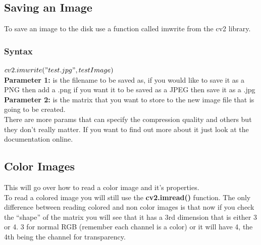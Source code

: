 \documentclass[fleqn]{article}
\begin{document}
    \subsection{Saving an Image}
    To save an image to the disk use a function called imwrite from the cv2 library.
    \subsubsection{Syntax}
    \begin{center}
      $cv2.imwrite("test.jpg", testImage)$\\
      \textbf{Parameter 1:} is the filename to be saved as, if you would like to save it as a PNG then add a .png if you want it to be saved as a JPEG then save it as a .jpg\\
      \textbf{Parameter 2:} is the matrix that you want to store to the new image file that is going to be created. \\
      There are more params that can specify the compression quality and others but they don't really matter. If you want to find out more about it just look at the documentation online.
    \end{center}

    \newpage

    \subsection{Color Images}
    This will go over how to read a color image and it's properties. \\
    To read a colored image you will still use the \textbf{cv2.imread()} function. The only difference between reading colored and non color images is that now if you check the ``shape'' of the matrix you will see that it has a 3rd dimension that is either 3 or 4. 3 for normal RGB (remember each channel is a color) or it will have 4, the 4th being the channel for transparency.
\end{document}
